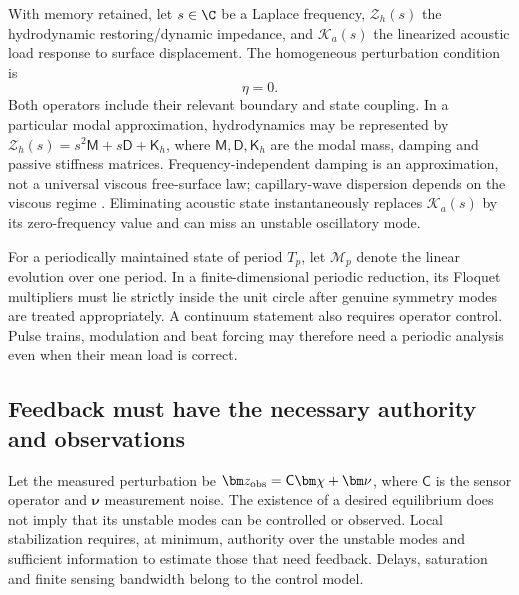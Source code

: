 With memory retained, let $s\in\C$ be a Laplace frequency,
$\mathcal Z_h(s)$ the hydrodynamic restoring/dynamic impedance, and
$\mathcal K_a(s)$ the linearized acoustic load response to surface displacement.
The homogeneous perturbation condition is
\begin{equation}
 [\mathcal Z_h(s)-\mathcal K_a(s)]\eta=0.
 \label{eq:memory-stability}
\end{equation}
Both operators include their relevant boundary and state coupling. In a
particular modal approximation, hydrodynamics may be represented by
$\mathcal Z_h(s)=s^2\mathsf M+s\mathsf D+\mathsf K_h$, where
$\mathsf M,\mathsf D,\mathsf K_h$ are the modal mass, damping and passive
stiffness matrices. Frequency-independent damping is an approximation, not a
universal viscous free-surface law; capillary-wave dispersion depends on the
viscous regime \cite{denner2016}. Eliminating acoustic state instantaneously
replaces $\mathcal K_a(s)$ by its zero-frequency value and can miss an unstable
oscillatory mode.

For a periodically maintained state of period $T_p$, let $\mathcal M_p$ denote
the linear evolution over one period. In a finite-dimensional periodic
reduction, its Floquet multipliers must lie strictly inside the unit circle
after genuine symmetry modes are treated appropriately. A continuum statement
also requires operator control. Pulse trains, modulation and beat forcing may
therefore need a periodic analysis even when their mean load is correct.

\subsection{Feedback must have the necessary authority and observations}
Let the measured perturbation be
$\bm z_{\rm obs}=\mathsf C\bm\chi+\bm\nu$, where $\mathsf C$ is the sensor
operator and $\bm\nu$ measurement noise. The existence of a desired equilibrium
does not imply that its unstable modes can be controlled or observed. Local
stabilization requires, at minimum, authority over the unstable modes and
sufficient information to estimate those that need feedback. Delays, saturation
and finite sensing bandwidth belong to the control model.

